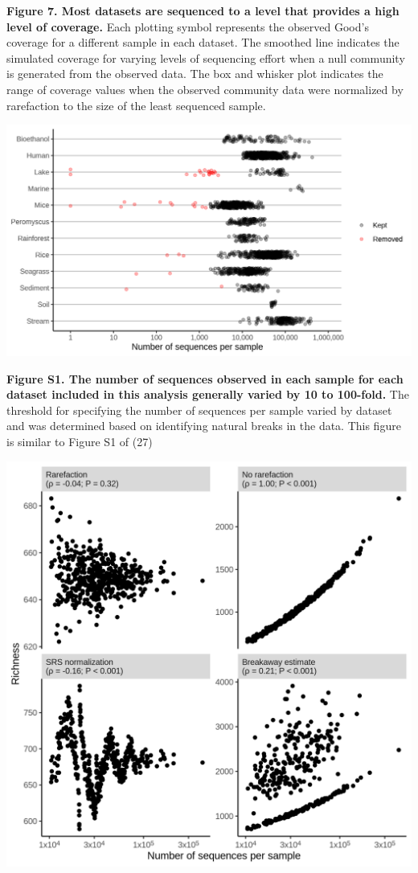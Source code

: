 \documentclass[
]{article}
\begin{document}
\textbf{Figure 7. Most datasets are sequenced to a level that provides a
high level of coverage.} Each plotting symbol represents the observed
Good's coverage for a different sample in each dataset. The smoothed
line indicates the simulated coverage for varying levels of sequencing
effort when a null community is generated from the observed data. The
box and whisker plot indicates the range of coverage values when the
observed community data were normalized by rarefaction to the size of
the least sequenced sample.

\newpage

\includegraphics{figure_s1.png}

\textbf{Figure S1. The number of sequences observed in each sample for
each dataset included in this analysis generally varied by 10 to
100-fold.} The threshold for specifying the number of sequences per
sample varied by dataset and was determined based on identifying natural
breaks in the data. This figure is similar to Figure S1 of (27)

\newpage

\includegraphics{figure_s2.png}
\end{document}
